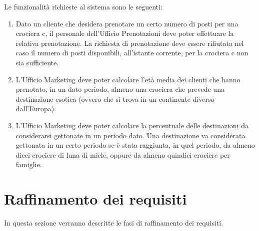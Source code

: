 \documentclass{article}
\begin{document}
Le funzionalità richieste al sistema sono le seguenti:

\begin{enumerate}
    \item Dato un cliente che desidera prenotare un certo numero di posti per una crociera c, il personale dell'Ufficio Prenotazioni deve poter effettuare la relativa prenotazione. La richiesta di prenotazione deve essere rifiutata nel caso il numero di posti disponibili, all'istante corrente, per la crociera c non sia sufficiente.
    \item L'Ufficio Marketing deve poter calcolare l'età media dei clienti che hanno prenotato, in un dato periodo, almeno una crociera che prevede una destinazione esotica (ovvero che si trova in un continente diverso dall'Europa).
    \item L'Ufficio Marketing deve poter calcolare la percentuale delle destinazioni da considerarsi gettonate in un periodo dato. Una destinazione va considerata gettonata in un certo periodo se è stata raggiunta, in quel periodo, da almeno dieci crociere di luna di miele, oppure da almeno quindici crociere per famiglie.
\end{enumerate}

\section{Raffinamento dei requisiti}

In questa sezione verranno descritte le fasi di raffinamento dei requisiti.
\end{document}
